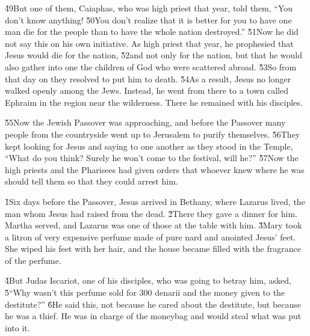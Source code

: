 \v{49}But one of them, Caiaphas, who was high priest that year, told them, ``You don't know anything! \v{50}You don't realize that it is better for you to have one man die for the people than to have the whole nation destroyed.'' \v{51}Now he did not say this on his own initiative. As high priest that year, he prophesied that Jesus would die for the nation, \v{52}and not only for the nation, but that he would also gather into one the children of God who were scattered abroad. \v{53}So from that day on they resolved to put him to death. \v{54}As a result, Jesus no longer walked openly among the Jews. Instead, he went from there to a town called Ephraim in the region near the wilderness. There he remained with his disciples.

\v{55}Now the Jewish Passover was approaching, and before the Passover many people from the countryside went up to Jerusalem to purify themselves. \v{56}They kept looking for Jesus and saying to one another as they stood in the Temple, ``What do you think? Surely he won't come to the festival, will he?'' \v{57}Now the high priests and the Pharisees had given orders that whoever knew where he was should tell them so that they could arrest him.

\v{1}Six days before the Passover, Jesus arrived in Bethany, where Lazarus lived, the man whom Jesus had raised from the dead. \v{2}There they gave a dinner for him. Martha served, and Lazarus was one of those at the table with him. \v{3}Mary took a litron of very expensive perfume made of pure nard and anointed Jesus' feet. She wiped his feet with her hair, and the house became filled with the fragrance of the perfume.

\v{4}But Judas Iscariot, one of his disciples, who was going to betray him, asked, \v{5}``Why wasn't this perfume sold for 300 denarii and the money given to the destitute?'' \v{6}He said this, not because he cared about the destitute, but because he was a thief. He was in charge of the moneybag and would steal what was put into it.


